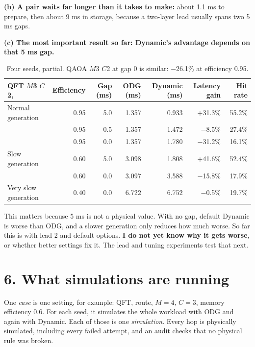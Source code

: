 \documentclass[10.5pt,a4paper]{article}
\newcommand{\code}[1]{\texttt{\detokenize{#1}}}
\begin{document}
\textbf{(b) A pair waits far longer than it takes to make:} about 1.1 ms to prepare, then about 9 ms in storage, because a two-layer lead usually spans two 5 ms gaps.

\textbf{(c) The most important result so far: Dynamic's advantage depends on that 5 ms gap.}
\begin{table}[H]\centering\small
\begin{tabular}{@{}lrrrrrr@{}}\toprule
QFT $M$3 $C$2, \code{history} & Efficiency & Gap (ms) & ODG (ms) & Dynamic (ms) & Latency gain & Hit rate \\\midrule
Normal generation & 0.95 & 5.0 & 1.357 & 0.933 & +31.3\% & 55.2\% \\
 & 0.95 & 0.5 & 1.357 & 1.472 & $-$8.5\% & 27.4\% \\
 & 0.95 & 0.0 & 1.357 & 1.780 & $-$31.2\% & 16.1\% \\
Slow generation & 0.60 & 5.0 & 3.098 & 1.808 & +41.6\% & 52.4\% \\
 & 0.60 & 0.0 & 3.097 & 3.588 & $-$15.8\% & 17.9\% \\
Very slow generation & 0.40 & 0.0 & 6.722 & 6.752 & $-$0.5\% & 19.7\% \\\bottomrule
\end{tabular}\caption{Four seeds, partial. QAOA $M$3 $C$2 at gap 0 is similar: $-$26.1\% at efficiency 0.95.}\end{table}

This matters because 5 ms is not a physical value. With no gap, default Dynamic is worse than ODG, and a slower generation only reduces how much worse.
So far this is with lead 2 and default options. \textbf{I do not yet know why it gets worse}, or whether better settings fix it. The lead and tuning experiments test that next.

\section*{6. What simulations are running}
One \emph{case} is one setting, for example: QFT, \code{history} route, $M=4$, $C=3$, memory efficiency 0.6.
For each seed, it simulates the whole workload with ODG and again with Dynamic. Each of those is one \emph{simulation}.
Every hop is physically simulated, including every failed attempt, and an audit checks that no physical rule was broken.
\end{document}
